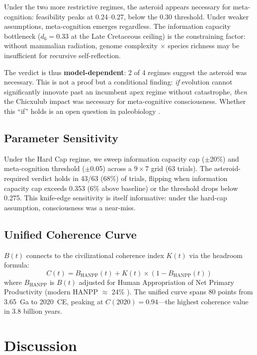 \documentclass[10pt,letterpaper]{article}
\newcommand{\bt}{$B(t)$}
\newcommand{\kt}{$K(t)$}
\begin{document}
Under the two more restrictive regimes, the asteroid appears necessary for
meta-cognition: feasibility peaks at 0.24--0.27, below the 0.30 threshold.
Under weaker assumptions, meta-cognition emerges regardless. The information
capacity bottleneck ($d_6 = 0.33$ at the Late Cretaceous ceiling) is the
constraining factor: without mammalian radiation, genome complexity $\times$
species richness may be insufficient for recursive self-reflection.

The verdict is thus \textbf{model-dependent}: 2 of 4 regimes suggest the
asteroid was necessary. This is not a proof but a conditional finding:
\emph{if} evolution cannot significantly innovate past an incumbent apex
regime without catastrophe, \emph{then} the Chicxulub impact was necessary
for meta-cognitive consciousness. Whether this ``if'' holds is an open
question in paleobiology \cite{erwin2001}.

\subsection*{Parameter Sensitivity}

Under the Hard Cap regime, we sweep information capacity cap ($\pm$20\%)
and meta-cognition threshold ($\pm$0.05) across a $9 \times 7$ grid
(63 trials). The asteroid-required verdict holds in 43/63 (68\%) of trials,
flipping when information capacity cap exceeds 0.353 (6\% above baseline)
or the threshold drops below 0.275. This knife-edge sensitivity is itself
informative: under the hard-cap assumption, consciousness was a near-miss.

\subsection*{Unified Coherence Curve}

\bt{} connects to the civilizational coherence index \kt{} \cite{stoltz2026kt}
via the headroom formula:
\begin{equation}
C(t) = B_\text{HANPP}(t) + K(t) \times (1 - B_\text{HANPP}(t))
\end{equation}
where $B_\text{HANPP}$ is \bt{} adjusted for Human Appropriation of Net Primary
Productivity (modern HANPP $\approx$ 24\% \cite{haberl2007}). The unified curve
spans 80 points from 3.65~Ga to 2020~CE, peaking at $C(2020) = 0.94$---the
highest coherence value in 3.8 billion years.

\section*{Discussion}
\end{document}
